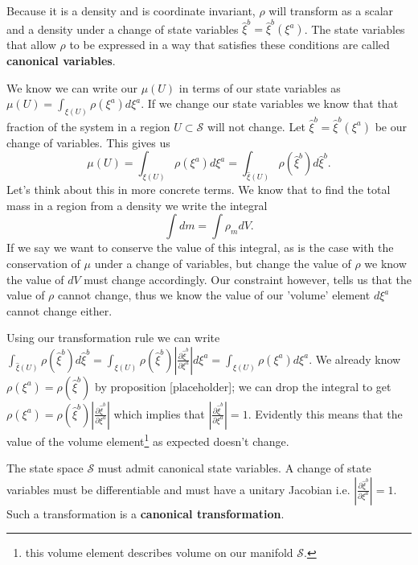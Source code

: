 \documentclass{article}
\begin{document}

\begin{prop}
	Because it is a density and is coordinate invariant, $\rho$ will transform as a scalar and a density under a change of state variables $\hat{\xi}^b = \hat{\xi}^b(\xi^a)$. The state variables that allow $\rho$ to be expressed in a way that satisfies these conditions are called \textbf{canonical variables}.
\end{prop}


	We know we can write our $\mu(U)$ in terms of our state variables as $\mu(U) = \int_{\xi(U)} \rho(\xi^a)d\xi^a$. If we change our state variables we know that that fraction of the system in a region $U \subset \mathcal{S}$ will not change. Let $\hat{\xi}^b = \hat{\xi}^b(\xi^a)$ be our change of variables. This gives us $$\mu(U) = \int_{\xi(U)} \rho(\xi^a)d\xi^a = \int_{\hat{\xi}(U)} \rho(\hat{\xi}^b)d\hat{\xi}^b.$$ Let's think about this in more concrete terms. We know that to find the total mass in a region from a density we write the integral $$\int dm = \int \rho_m dV.$$ If we say we want to conserve the value of this integral, as is the case with the conservation of $\mu$ under a change of variables, but change the value of $\rho$ we know the value of $dV$ must change accordingly. Our constraint however, tells us that the value of $\rho$ cannot change, thus we know the value of our 'volume' element $d\xi^a$ cannot change either.
	
	Using our transformation rule we can write $\int_{\hat{\xi}(U)} \rho(\hat{\xi}^b)d\hat{\xi}^b = \int_{\xi(U)} \rho(\hat{\xi}^b)\left|\frac{\partial\hat{\xi}^b}{\partial\xi^a}\right|d\xi^a = \int_{\xi(U)} \rho(\xi^a)d\xi^a$. We already know $\rho(\xi^a) = \rho(\hat{\xi}^b)$ by proposition [placeholder]; we can drop the integral to get $\rho(\xi^a) = \rho(\hat{\xi}^b)\left|\frac{\partial\hat{\xi}^b}{\partial\xi^a}\right|$ which implies that $\left|\frac{\partial\hat{\xi}^b}{\partial\xi^a}\right| = 1$. Evidently this means that the value of the volume element\footnote{this volume element describes volume on our manifold $\mathcal{S}$.} as expected doesn't change.
	
\begin{prop}
	The state space $\mathcal{S}$ must admit canonical state variables. A change of state variables must be differentiable and must have a unitary Jacobian i.e. $\left|\frac{\partial\hat{\xi}^b}{\partial\xi^a}\right| = 1$. Such a transformation is a \textbf{canonical transformation}.
\end{prop}
\end{document}
